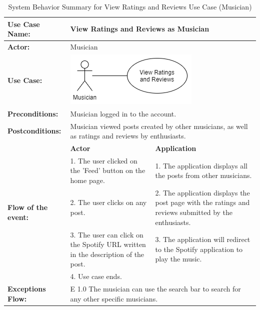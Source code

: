 \begin{longtable}{|p{3cm}|p{5cm}|p{5cm}|}
    \caption{System Behavior Summary for View Ratings and Reviews Use Case (Musician)} \\
    \hline
    \textbf{Use Case Name:} & \multicolumn{2}{l|}{View Ratings and Reviews as Musician} \\ \hline
    \textbf{Actor:} & \multicolumn{2}{l|}{Musician} \\ \hline
    \textbf{Use Case:} & \multicolumn{2}{l|}{\includegraphics[width=0.5\linewidth]{mainmatter/images/sucd4.png}} \\ \hline
    \textbf{Preconditions:} & \multicolumn{2}{p{10cm}|}{Musician logged in to the account.} \\ \hline
    \textbf{Postconditions:} & \multicolumn{2}{p{10cm}|}{Musician viewed posts created by other musicians, as well as ratings and reviews by enthusiasts.} \\ \hline
    \multirow{5}{3cm}{\raggedright \textbf{Flow of the event:}} & \textbf{Actor} & \textbf{Application} \\ \cline{2-3}
    & 1. The user clicked on the 'Feed' button on the home page. & 1. The application displays all the posts from other musicians. \\ \cline{2-3}
    & 2. The user clicks on any post. & 2. The application displays the post page with the ratings and reviews submitted by the enthusiasts.  \\ \cline{2-3}
    & 3. The user can click on the Spotify URL written in the description of the post. & 3. The application will redirect to the Spotify application to play the music. \\ \cline{2-3}
    & 4. Use case ends. & \\ \hline
    \multirow{1}{3cm}{\raggedright \textbf{Exceptions Flow:}} & \multicolumn{2}{p{10cm}|}{\raggedright E 1.0 The musician can use the search bar to search for any other specific musicians.} \\ \hline
\end{longtable}
\pagebreak

